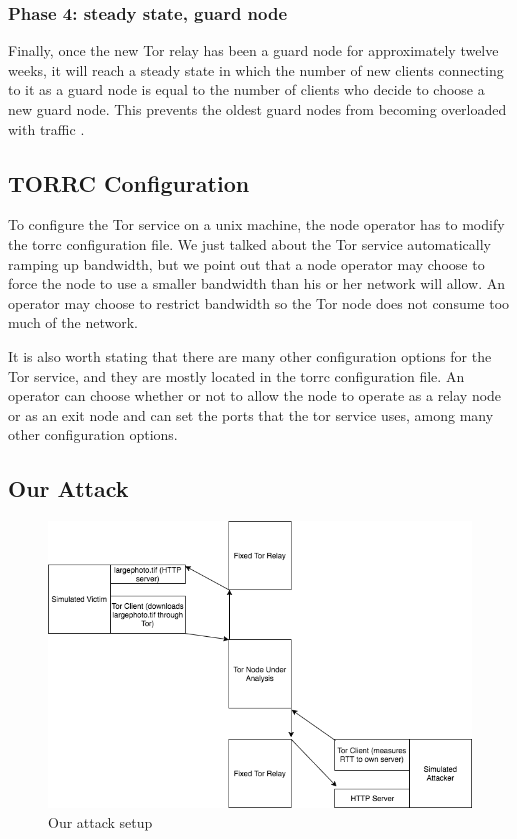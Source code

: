 \documentclass[12pt,journal]{IEEEtran}
\begin{document}
\subsubsection{Phase 4: steady state, guard node}
Finally, once the new Tor relay has been a guard node for approximately twelve weeks, it will reach a steady state in which the number of new clients connecting to it as a guard node is equal to the number of clients who decide to choose a new guard node. This prevents the oldest guard nodes from becoming overloaded with traffic \cite{arma2013}.
\subsection{TORRC Configuration}
To configure the Tor service on a unix machine, the node operator has to modify the torrc configuration file. We just talked about the Tor service automatically ramping up bandwidth, but we point out that a node operator may choose to force the node to use a smaller bandwidth than his or her network will allow. An operator may choose to restrict bandwidth so the Tor node does not consume too much of the network.
\par
It is also worth stating that there are many other configuration options for the Tor service, and they are mostly located in the torrc configuration file. An operator can choose whether or not to allow the node to operate as a relay node or as an exit node and can set the ports that the tor service uses, among many other configuration options.
\subsection{Our Attack}
\begin{figure}
 \center
  \includegraphics[width=\textwidth]{figures/oursetup.png}
  \caption{Our attack setup}
  \label{oursetup}
\end{figure}
\end{document}
